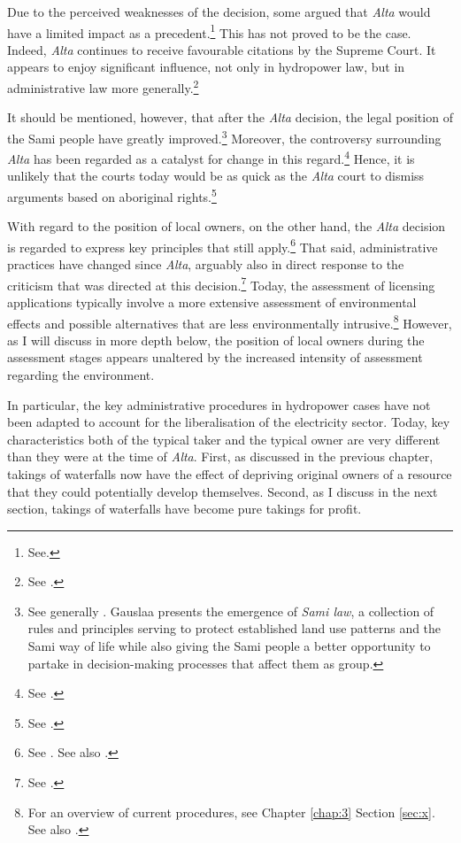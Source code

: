 Due to the perceived weaknesses of the decision, some argued that {\it Alta} would have a limited impact as a precedent.\footnote{See\cite[580-584]{backer86}.} This has not proved to be the case. Indeed, {\it Alta} continues to receive favourable citations by the Supreme Court. It appears to enjoy significant influence, not only in hydropower law, but in administrative law more generally.\footnote{See \cite{ambassade09,jorpeland11}.}

It should be mentioned, however, that after the {\it Alta} decision, the legal position of the Sami people have greatly improved.\footnote{See generally \cite{gauslaa07}. Gauslaa presents the emergence of {\it Sami law}, a collection of rules and principles serving to protect established land use patterns and the Sami way of life while also giving the Sami people a better opportunity to partake in decision-making processes that affect them as group.} Moreover, the controversy surrounding {\it Alta} has been regarded as a catalyst for change in this regard.\footnote{See \cite[156]{ravna12s}.} Hence, it is unlikely that the courts today would be as quick as the {\it Alta} court to dismiss arguments based on aboriginal rights.\footnote{See \cite[180]{gauslaa07}.}

With regard to the position of local owners, on the other hand, the {\it Alta} decision is regarded to express key principles that still apply.\footnote{See \cite{jorpeland11}. See also \cite[312]{haagensen02}.} That said, administrative practices have changed since {\it Alta}, arguably also in direct response to the criticism that was directed at this decision.\footnote{See \cite[122-123]{backer10}.} Today, the assessment of licensing applications typically involve a more extensive assessment of environmental effects and possible alternatives that are less environmentally intrusive.\footnote{For an overview of current procedures, see Chapter \ref{chap:3} Section \ref{sec:x}. See also \cite[625-659]{backer86}.} However, as I will discuss in more depth below, the position of local owners during the assessment stages appears unaltered by the increased intensity of assessment regarding the environment. 

In particular, the key administrative procedures in hydropower cases have not been adapted to account for the liberalisation of the electricity sector. Today, key characteristics both of the typical taker and the typical owner are very different than they were at the time of {\it Alta}. First, as discussed in the previous chapter, takings of waterfalls now have the effect of depriving original owners of a resource that they could potentially develop themselves. Second, as I discuss in the next section, takings of waterfalls have become pure takings for profit.

